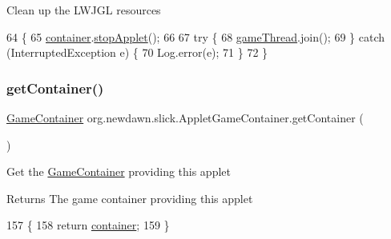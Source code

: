 Clean up the L\+W\+J\+GL resources 
\begin{DoxyCode}
64                                \{
65       \mbox{\hyperlink{classorg_1_1newdawn_1_1slick_1_1_applet_game_container_ad11e66254b14c604db1a66c3d4efc818}{container}}.\mbox{\hyperlink{classorg_1_1newdawn_1_1slick_1_1_applet_game_container_1_1_container_a9e11859f475dfad8eb146c894b7cf814}{stopApplet}}();
66       
67       \textcolor{keywordflow}{try} \{
68          \mbox{\hyperlink{classorg_1_1newdawn_1_1slick_1_1_applet_game_container_a490e718a0298d5f4731c117197fb36d0}{gameThread}}.join();
69       \} \textcolor{keywordflow}{catch} (InterruptedException e) \{
70          Log.error(e);
71       \}
72    \}
\end{DoxyCode}
\mbox{\label{classorg_1_1newdawn_1_1slick_1_1_applet_game_container_aab420b4026d156dcfb6b5b2bc614d5ce}} 
\subsubsection{\texorpdfstring{get\+Container()}{getContainer()}}
{\footnotesize\ttfamily \mbox{\hyperlink{classorg_1_1newdawn_1_1slick_1_1_game_container}{Game\+Container}} org.\+newdawn.\+slick.\+Applet\+Game\+Container.\+get\+Container (\begin{DoxyParamCaption}{ }\end{DoxyParamCaption})\hspace{0.3cm}{\ttfamily [inline]}}

Get the \mbox{\hyperlink{classorg_1_1newdawn_1_1slick_1_1_game_container}{Game\+Container}} providing this applet

\begin{DoxyReturn}{Returns}
The game container providing this applet 
\end{DoxyReturn}

\begin{DoxyCode}
157                                        \{
158       \textcolor{keywordflow}{return} \mbox{\hyperlink{classorg_1_1newdawn_1_1slick_1_1_applet_game_container_ad11e66254b14c604db1a66c3d4efc818}{container}};
159    \}
\end{DoxyCode}
\mbox{\label{classorg_1_1newdawn_1_1slick_1_1_applet_game_container_ae10d7b8c504322bcbf04333382230df1}} 
